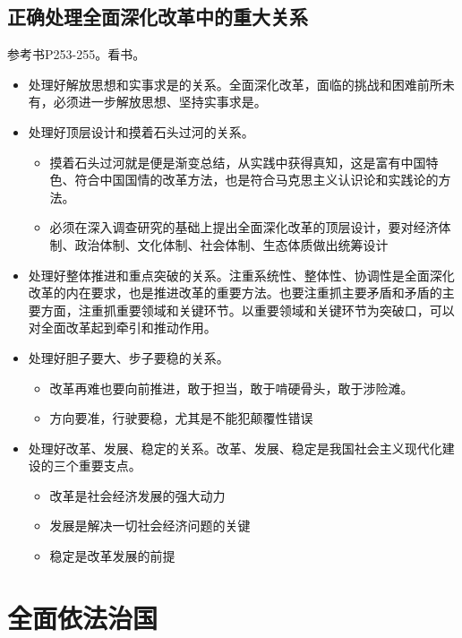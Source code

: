     \subsection{正确处理全面深化改革中的重大关系}
        参考书P253-255。看书。
        \begin{itemize}
            \item 处理好解放思想和实事求是的关系。全面深化改革，面临的挑战和困难前所未有，必须进一步解放思想、坚持实事求是。
            \item 处理好顶层设计和摸着石头过河的关系。
            \begin{itemize}
                \item 摸着石头过河就是便是渐变总结，从实践中获得真知，这是富有中国特色、符合中国国情的改革方法，也是符合马克思主义认识论和实践论的方法。
                \item 必须在深入调查研究的基础上提出全面深化改革的顶层设计，要对经济体制、政治体制、文化体制、社会体制、生态体质做出统筹设计
            \end{itemize}
            \item 处理好整体推进和重点突破的关系。注重系统性、整体性、协调性是全面深化改革的内在要求，也是推进改革的重要方法。也要注重抓主要矛盾和矛盾的主要方面，注重抓重要领域和关键环节。以重要领域和关键环节为突破口，可以对全面改革起到牵引和推动作用。
            \item 处理好胆子要大、步子要稳的关系。
            \begin{itemize}
                \item 改革再难也要向前推进，敢于担当，敢于啃硬骨头，敢于涉险滩。
                \item 方向要准，行驶要稳，尤其是不能犯颠覆性错误
            \end{itemize}
            \item 处理好改革、发展、稳定的关系。改革、发展、稳定是我国社会主义现代化建设的三个重要支点。
            \begin{itemize}
                \item 改革是社会经济发展的强大动力
                \item 发展是解决一切社会经济问题的关键
                \item 稳定是改革发展的前提
            \end{itemize}
        \end{itemize}


\section{全面依法治国}
